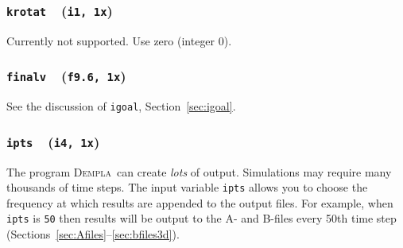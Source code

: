 \documentclass[letterpaper,11pt]{article}
\newcommand{\Dempla}{\textsc{Dempla}}
\newcommand{\Var}[2]{\texttt{#1}\ \  (\texttt{#2})}
\newlength{\Labelwidth}
\newcommand{\Entrylabel}[1]{\makebox[\Labelwidth][r]{\texttt{#1}}}
\newenvironment{Options}
{\begin{list}{}{%
\renewcommand{\makelabel}{\Entrylabel}%
\setlength{\leftmargin} {0.90in}%
\setlength{\rightmargin}{0.00in}%
\setlength{\labelsep}   {0.10in}%
\setlength{\labelwidth} {\Labelwidth}%
}}
{\end{list}}
\begin{document}
\subsubsection[\texttt{krotat}]{\Var{krotat}{i1, 1x}}\label{sec:krotat}
Currently not supported.
Use zero (integer 0).
%
%
\subsubsection[\texttt{finalv}]{\Var{finalv}{f9.6, 1x}}\label{sec:finalv}
See the discussion of \texttt{igoal}, Section~\ref{sec:igoal}.
%
\subsubsection[\texttt{ipts}]{\Var{ipts}{i4, 1x}}\label{sec:ipts}
The program \Dempla\ can create \emph{lots} of output.
Simulations may require many thousands of time steps.
The input variable \texttt{ipts} allows you to choose
the frequency at which results are appended to the
output files.
For example, when \texttt{ipts} is \texttt{50} then
results will be output 
to the A- and B-files every 50th time step
(Sections~\ref{sec:Afiles}--\ref{sec:bfiles3d}).
%
\end{document}
